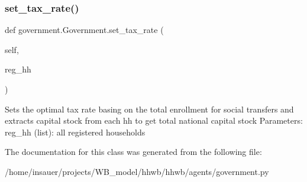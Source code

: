 \subsubsection{\texorpdfstring{set\+\_\+tax\+\_\+rate()}{set\_tax\_rate()}}
{\footnotesize\ttfamily def government.\+Government.\+set\+\_\+tax\+\_\+rate (\begin{DoxyParamCaption}\item[{}]{self,  }\item[{}]{reg\+\_\+hh }\end{DoxyParamCaption})}

\begin{DoxyVerb}Sets the optimal tax rate basing on the total enrollment for social transfers and
extracts capital stock from each hh to get total national capital stock
    Parameters:
reg_hh (list): all registered households
\end{DoxyVerb}
 

The documentation for this class was generated from the following file\+:\begin{DoxyCompactItemize}
\item 
/home/insauer/projects/\+W\+B\+\_\+model/hhwb/hhwb/agents/government.\+py\end{DoxyCompactItemize}
